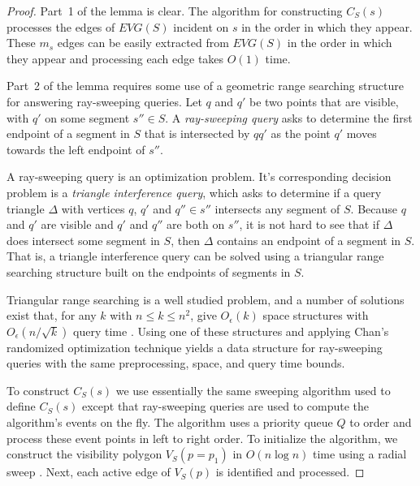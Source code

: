 \documentclass{patmorin}
\newcommand{\EVG}{\mathit{EVG}}
\newcommand{\Oe}{O_\epsilon}
\begin{document}
\begin{proof}
Part~1 of the lemma is clear. The algorithm for constructing $C_S(s)$
processes the edges of $\EVG(S)$ incident on $s$ in the order in which
they appear.  These $m_s$ edges can be easily extracted from $\EVG(S)$ in
the order in which they appear and processing each edge takes $O(1)$ time.

Part~2 of the lemma requires some use of a geometric range searching
structure for answering ray-sweeping queries.  Let $q$ and $q'$ be two
points that are visible, with $q'$ on some segment $s''\in S$.  A
\emph{ray-sweeping query} asks to determine the first endpoint of a segment
in $S$ that is intersected by $qq'$ as the point $q'$ moves towards the
left endpoint of $s''$.

A ray-sweeping query is an optimization problem.  It's corresponding
decision problem is a \emph{triangle interference query}, which asks to
determine if a query triangle $\Delta$ with vertices $q$, $q'$ and $q''\in
s''$ intersects any segment of $S$.  Because $q$ and $q'$ are visible and
$q'$ and $q''$ are both on $s''$, it is not hard to see that if $\Delta$
does intersect some segment in $S$, then $\Delta$ contains an endpoint of a
segment in $S$.  That is, a triangle interference query can be solved using
a triangular range searching structure built on the endpoints of segments
in $S$.

Triangular range searching is a well studied problem, and a number of
solutions exist that, for any $k$ with $n\le k\le n^2$, give $\Oe(k)$
space structures with $\Oe(n/\sqrt{k})$ query time \cite[Section~4]{ae99}.
Using one of these structures and applying Chan's randomized optimization
technique \cite[Theorem~3.2]{c99} yields a data structure for ray-sweeping
queries with the same preprocessing, space, and query time bounds.

To construct $C_S(s)$ we use essentially the same sweeping algorithm used
to define $C_S(s)$ except that ray-sweeping queries are used to compute
the algorithm's events on the fly.  The algorithm uses a priority queue
$Q$ to order and process these event points in left to right order.
To initialize the algorithm, we construct the visibility polygon
$V_S(p=p_1)$ in $O(n\log n)$ time using a radial sweep \cite{a85,so84}.
Next, each active edge of $V_S(p)$ is identified and processed.


\end{proof}
\end{document}
